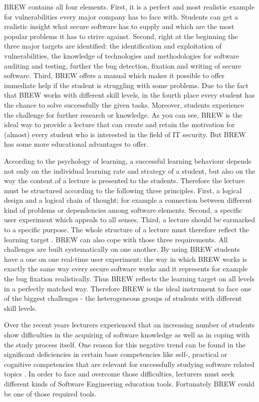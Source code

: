 \documentclass{llncs}
\begin{document}
BREW contains all four elements.
First, it is a perfect and most realistic example for vulnerabilities every major company has to face with.
Students can get a realistic insight what secure software has to supply and which are the most popular problems it has to strive against.
Second, right at the beginning the three major targets are identified: the identification and exploitation of vulnerabilities, the knowledge of technologies and methodologies for software auditing and testing, further the bug detection, fixation and writing of secure software.
Third, BREW offers a manual which makes it possible to offer immediate help if the student is struggling with some problems.
Due to the fact that BREW works with different skill levels, in the fourth place every student has the chance to solve successfully the given tasks.
Moreover, students experience the challenge for further research or knowledge.
As you can see, BREW is the ideal way to provide a lecture that can create and retain the motivation for (almost) every student who is interested in the field of IT security.
But BREW has some more educational advantages to offer.

According to the psychology of learning, a successful learning behaviour depends not only on the individual learning rate and strategy of a student, but also on the way the content of a lecture is presented to the students.
Therefore the lecture must be structured according to the following three principles.
First, a logical design and a logical chain of thought; for example a connection between different kind of problems or dependencies among software elements.
Second, a specific user experiment which appeals to all senses.
Third, a lecture should be earmarked to a specific purpose.
The whole structure of a lecture must therefore reflect the learning target \cite{Brocke:2007eg,Mienert:2011kx,Wild:2009uz}. 
BREW can also cope with those three requirements.
All challenges are built systematically on one another.
By using BREW students have a one on one real-time user experiment: the way in which BREW works is exactly the same way every secure software works and it represents for example the bug fixation realistically.
Thus BREW reflects the learning target on all levels in a perfectly matched way.
Therefore BREW is the ideal instrument to face one of the biggest challenges - the heterogeneous groups of students with different skill levels.
 
Over the recent years lecturers experienced that an increasing number of students show difficulties in the acquiring of software knowledge as well as in coping with the study process itself.
One reason for this negative trend can be found in the significant deficiencies in certain base competencies like self-, practical or cognitive competencies that are relevant for successfully studying software related topics \cite{Bottcher:2014wv}. 
In order to face and overcome those difficulties, lecturers must seek different kinds of Software Engineering education tools.
Fortunately BREW could be one of those required tools.
\end{document}
